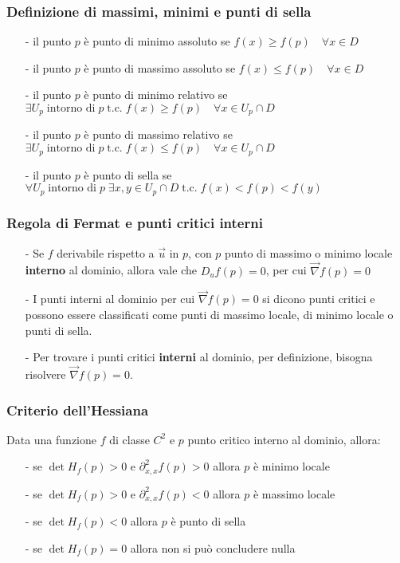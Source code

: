 \documentclass[a4paper]{article}
\newcommand\tc{\text{t.c.}}   %
\begin{document}
\subsubsection*{Definizione di massimi, minimi e punti di sella}
\begin{itemize}[topsep=3pt, itemsep=0pt]
	\item[-] il punto \(p\) è punto di minimo assoluto se \(f(x) \geq f(p) \quad \forall x \in D\)
	\item[-] il punto \(p\) è punto di massimo assoluto se \(f(x) \leq f(p) \quad \forall x \in D\)
	\item[-] il punto \(p\) è punto di minimo relativo se \(\exists U_p \; \text{intorno di} \; p \; \tc \; f(x) \geq f(p) \quad \forall x \in U_p \cap D\)
	\item[-] il punto \(p\) è punto di massimo relativo se \(\exists U_p \; \text{intorno di} \; p \; \tc \; f(x) \leq f(p) \quad \forall x \in U_p \cap D\)
	\item[-] il punto \(p\) è punto di sella se \(\forall U_p \; \text{intorno di} \; p \; \exists x,y \in U_p \cap D \; \tc \; f(x) < f(p) < f(y)\)
\end{itemize}

\subsubsection*{Regola di Fermat e punti critici interni}
\begin{itemize}[topsep=3pt, itemsep=0pt]
	\item[-] Se \(f\) derivabile rispetto a \(\vec{u}\) in \(p\), con \(p\) punto di massimo o minimo locale \textbf{interno}
	al dominio, allora vale che \(D_u f(p) = 0\), per cui \(\vec{\nabla} f(p) = 0\)
	\item[-] I punti interni al dominio per cui \(\vec{\nabla} f(p) = 0\) si dicono punti critici e possono essere classificati
	come punti di massimo locale, di minimo locale o punti di sella.
	\item[-] Per trovare i punti critici \textbf{interni} al dominio, per definizione, bisogna risolvere \(\vec{\nabla} f(p) = 0\).
\end{itemize}

\subsubsection*{Criterio dell'Hessiana}
Data una funzione \(f\) di classe \(C^2\) e \(p\) punto critico interno al dominio, allora:
\begin{itemize}[topsep=3pt, itemsep=0pt]
	\item[-] se \(\det H_f(p) > 0\) e \(\partial^2_{x,x}f(p) > 0\) allora \(p\) è minimo locale
	\item[-] se \(\det H_f(p) > 0\) e \(\partial^2_{x,x}f(p) < 0\) allora \(p\) è massimo locale
	\item[-] se \(\det H_f(p) < 0\) allora \(p\) è punto di sella
	\item[-] se \(\det H_f(p) = 0\) allora non si può concludere nulla
\end{itemize}
\end{document}
